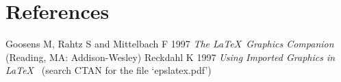 \documentclass[12pt]{iopart}
\begin{document}





\section*{References}
\begin{thebibliography}{10}
 Goosens M, Rahtz S and Mittelbach F 1997 {\it The \LaTeX\ Graphics Companion\/} 
(Reading, MA: Addison-Wesley)
 Reckdahl K 1997 {\it Using Imported Graphics in \LaTeX\ } (search CTAN for the file `epslatex.pdf')
\end{thebibliography}
\end{document}
